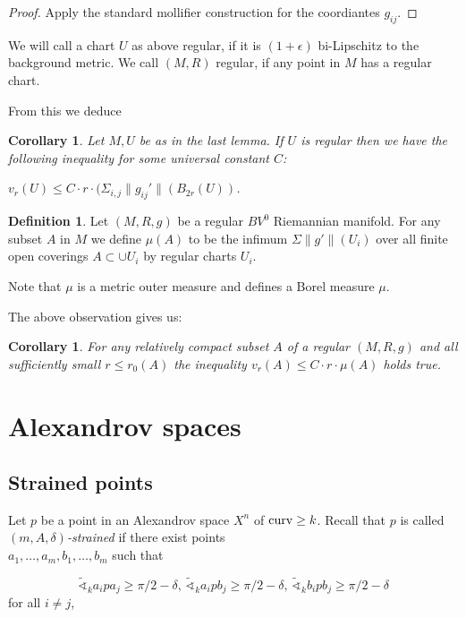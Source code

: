 \documentclass[12pt,leqno]{amsart}
\numberwithin{equation}{section}
\newtheorem{cor}[thm]{Corollary}
\theoremstyle{definition}
\newtheorem{defn}[thm]{Definition}%
\theoremstyle{remark}
\newcommand{\curv}{\mathop{\rm curv}}
\begin{document}
\begin{proof}
Apply the standard mollifier construction for the coordiantes $g_{ij}$.
\end{proof}


  We will call a chart $U$ as above regular, if it is $(1+\epsilon)$ bi-Lipschitz to
  the background metric. We call $(M,R)$ regular, if any point in $M$ has a regular
  chart.

 From this we deduce
 \begin{cor}\label{cor-dc-vr}
 Let $M,U$ be  as in the last lemma. If $U$ is regular  then we have the following inequality for some
 universal constant $C$:

 $v_r (U) \leq C \cdot r \cdot (\Sigma _{i,j} \|g_{ij} '\| (B_{2r} (U))$.
\end{cor}


\begin{defn}
Let $(M,R,g)$ be a regular $BV^0$ Riemannian manifold. For any  subset
$A$ in $M$ we define $\mu (A)$ to be the infimum $\Sigma \|g '\| (U_i)$   over all finite open coverings $A\subset  \cup U_i$
by regular charts $U_i$.
\end{defn}

 Note that $\mu$ is a metric outer measure and defines a Borel measure $\mu$.


 The above observation gives us:
 \begin{cor}\label{cor-mu-dc}
 For any relatively compact subset $A$ of a regular $(M,R,g)$ and all sufficiently small $r \leq r_0 (A)$ the
 inequality $v_r (A) \leq C \cdot r \cdot \mu (A)$ holds true.
 \end{cor}





\section{Alexandrov spaces} \label{sec:Alex}


\subsection{Strained points}
Let $p$ be a point in an  Alexandrov space $X^n$ of $\curv\ge k$. Recall that $p$ is called \emph{$(m,A,\delta)$-strained} if there exist points\\ $a_1,\ldots, a_m, b_1,\ldots, b_m$ such that

\[
\tilde\sphericalangle_ka_ipa_j\ge \pi/2-\delta,\,\tilde\sphericalangle_ka_ipb_j\ge \pi/2-\delta,\, \tilde\sphericalangle_kb_ipb_j\ge \pi/2-\delta
\]
for all $i\ne j$,
\end{document}
